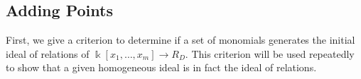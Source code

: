 \documentclass{amsart}
\theoremstyle{plain}
\theoremstyle{definition}
\theoremstyle{remark}
\numberwithin{equation}{section}
\newcommand\ssec{\subsection}
\newcommand\BN{{\mathbb N}}
\newcommand\BQ{{\mathbb Q}}
\newcommand\Bk{{\Bbbk}}
\DeclareMathOperator\di{Div}
\newcommand\sx{\mathscr X}
\newcommand{\halfcan}{L}
\DeclareMathOperator{\initial}{in_\prec}
\begin{document}
\ssec{Adding Points}
\label{ssec:add-points}
First, we give a criterion to determine if a set of monomials generates the initial ideal of relations of $\Bk[x_1, \ldots, x_m] \to R_D$.  This criterion will be used repeatedly to show that a given homogeneous ideal is in fact the ideal of relations.
\end{document}
